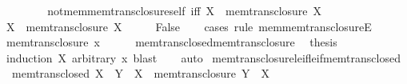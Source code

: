 \begin{isabellebody}
\ \ \ \ \isamarkupfalse%
\isanewline
\ \ \isamarkupfalse%
\isanewline
{}\isamarkupfalse%
%
\endisatagproof
{\isafoldproof}%
%
\isadelimproof
\isanewline
%
\endisadelimproof
\isanewline
{}\isamarkupfalse%
\ not{\isacharunderscore}{\kern0pt}mem{\isacharunderscore}{\kern0pt}mem{\isacharunderscore}{\kern0pt}trans{\isacharunderscore}{\kern0pt}closure{\isacharunderscore}{\kern0pt}self\ {\isacharbrackleft}{\kern0pt}iff{\isacharbrackright}{\kern0pt}{\isacharcolon}{\kern0pt}\ {\isachardoublequoteopen}X\ {\isasymnotin}\ mem{\isacharunderscore}{\kern0pt}trans{\isacharunderscore}{\kern0pt}closure\ X{\isachardoublequoteclose}\isanewline
%
\isadelimproof
%
\endisadelimproof
%
\isatagproof
{}\isamarkupfalse%
\isanewline
\ \ \isamarkupfalse%
\ {\isachardoublequoteopen}X\ {\isasymin}\ mem{\isacharunderscore}{\kern0pt}trans{\isacharunderscore}{\kern0pt}closure\ X{\isachardoublequoteclose}\isanewline
\ \ \isamarkupfalse%
\ \isamarkupfalse%
\ False\isanewline
\ \ \isamarkupfalse%
\ {\isacharparenleft}{\kern0pt}cases\ rule{\isacharcolon}{\kern0pt}\ mem{\isacharunderscore}{\kern0pt}mem{\isacharunderscore}{\kern0pt}trans{\isacharunderscore}{\kern0pt}closureE{\isacharparenright}{\kern0pt}\isanewline
\ \ \ \ \isamarkupfalse%
\ {\isacharparenleft}{\kern0pt}mem{\isacharunderscore}{\kern0pt}trans{\isacharunderscore}{\kern0pt}closure\ x{\isacharparenright}{\kern0pt}\isanewline
\ \ \ \ \isamarkupfalse%
\ mem{\isacharunderscore}{\kern0pt}trans{\isacharunderscore}{\kern0pt}closed{\isacharunderscore}{\kern0pt}mem{\isacharunderscore}{\kern0pt}trans{\isacharunderscore}{\kern0pt}closure\ \isamarkupfalse%
\ {\isacharquery}{\kern0pt}thesis\ \isamarkupfalse%
\ {\isacharparenleft}{\kern0pt}induction\ X\ arbitrary{\isacharcolon}{\kern0pt}\ x{\isacharparenright}{\kern0pt}\ blast\isanewline
\ \ \isamarkupfalse%
\ auto\isanewline
{}\isamarkupfalse%
%
\endisatagproof
{\isafoldproof}%
%
\isadelimproof
\isanewline
%
\endisadelimproof
\isanewline
{}\isamarkupfalse%
\ mem{\isacharunderscore}{\kern0pt}trans{\isacharunderscore}{\kern0pt}closure{\isacharunderscore}{\kern0pt}le{\isacharunderscore}{\kern0pt}if{\isacharunderscore}{\kern0pt}le{\isacharunderscore}{\kern0pt}if{\isacharunderscore}{\kern0pt}mem{\isacharunderscore}{\kern0pt}trans{\isacharunderscore}{\kern0pt}closed{\isacharcolon}{\kern0pt}\isanewline
\ \ {\isachardoublequoteopen}{\isasymlbrakk}mem{\isacharunderscore}{\kern0pt}trans{\isacharunderscore}{\kern0pt}closed\ X{\isacharsemicolon}{\kern0pt}\ \ Y\ {\isasymle}\ X{\isasymrbrakk}\ {\isasymLongrightarrow}\ mem{\isacharunderscore}{\kern0pt}trans{\isacharunderscore}{\kern0pt}closure\ Y\ {\isasymle}\ X{\isachardoublequoteclose}\isanewline

\end{isabellebody}
